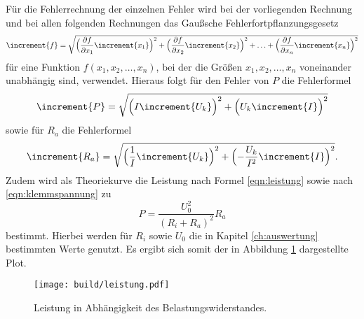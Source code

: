 Für die Fehlerrechnung der einzelnen Fehler wird bei der vorliegenden Rechnung und bei allen folgenden Rechnungen das Gaußsche Fehlerfortpflanzungsgesetz
\begin{equation}
\increment{f} = \sqrt{\Bigl(\frac{\partial f}{\partial x_1}\increment{x_1}\Bigr)^2 + \Bigl(\frac{\partial f}{\partial x_2}\increment{x_2}\Bigr)^2 + \dotsc + \Bigl(\frac{\partial f}{\partial x_n}\increment{x_n}\Bigr)^2}
\end{equation}
für eine Funktion $f(x_1,x_2, \dotsc ,x_n)$, bei der die Größen $x_1, x_2, \dotsc , x_n$ voneinander unabhängig sind, verwendet.
Hieraus folgt für den Fehler von $P$ die Fehlerformel
\begin{equation}
  \increment{P} = \sqrt{ \Bigl( I \increment{U_k} \Bigr)^2 + \Bigl( U_k \increment{I}  \Bigr)^2 }
\end{equation}
sowie für $R_a$ die Fehlerformel
\begin{equation}
  \increment{R_a} = \sqrt{ \Bigl( \frac{1}{I} \increment{U_k} \Bigr)^2 + \Bigl( - \frac{U_k}{I^2} \increment{I}  \Bigr)^2}.
\end{equation}
Zudem wird als Theoriekurve die Leistung nach Formel \ref{eqn:leistung} sowie nach \ref{eqn:klemmspannung} zu
\begin{equation}
  P = \frac{U_0^2}{(R_i + R_a)^2} R_a
\end{equation}
bestimmt.
Hierbei werden für $R_i$ sowie $U_0$ die in Kapitel \ref{ch:auswertung} bestimmten Werte genutzt.
Es ergibt sich somit der in Abbildung \ref{fig:5} dargestellte Plot.
\\
\begin{figure}[H]
  \centering
  \texttt{[image: build/leistung.pdf]}
  \caption{Leistung in Abhängigkeit des Belastungswiderstandes.}
  \label{fig:5}
\end{figure}
%
%    
%
